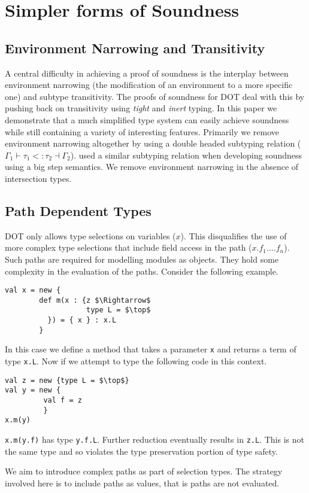 \section{Simpler forms of Soundness}

\subsection{Environment Narrowing and Transitivity}
A central difficulty in achieving a proof of soundness is the interplay between environment narrowing (the modification of an environment to a more specific one) and subtype transitivity. The proofs of soundness for DOT deal with this by pushing back on transitivity using \emph{tight} and \emph{inert} typing.
In this paper we demonstrate that a much simplified type system can easily achieve soundness while still containing a variety of interesting features. Primarily we remove environment narrowing altogether by using a double headed subtyping relation ($\Gamma_1 \vdash \tau_1 <: \tau_2 \dashv \Gamma_2$). \citeauthor{nada 2014} used a similar subtyping relation when developing soundness using a big step semantics. We remove environment narrowing in the absence of intersection types.

\subsection{Path Dependent Types}

DOT only allows type selections on variables ($x$). This disqualifies the use of more complex type selections that include field access in the path ($x.f_1 \ldots .f_n$). Such paths are required for modelling modules as objects. They hold some complexity in the evaluation of the paths. Consider the following example.
\begin{lstlisting}[mathescape, style=custom_lang]
val x = new {
        def m(x : {z $\Rightarrow$
                   type L = $\top$
          }) = { x } : x.L
        }
\end{lstlisting}
In this case we define a method that takes a parameter \verb|x| and returns a term of type \verb|x.L|. Now if we attempt to type the following code in this context.
\begin{lstlisting}[mathescape, style=custom_lang]
val z = new {type L = $\top$}
val y = new {
         val f = z
         }
x.m(y)
\end{lstlisting}
\verb|x.m(y.f)| has type \verb|y.f.L|. Further reduction eventually results in \verb|z.L|. This is not the same type and so violates the type preservation portion of type safety.

We aim to introduce complex paths as part of selection types. The strategy involved here is to include paths as values, that is paths are not evaluated.

